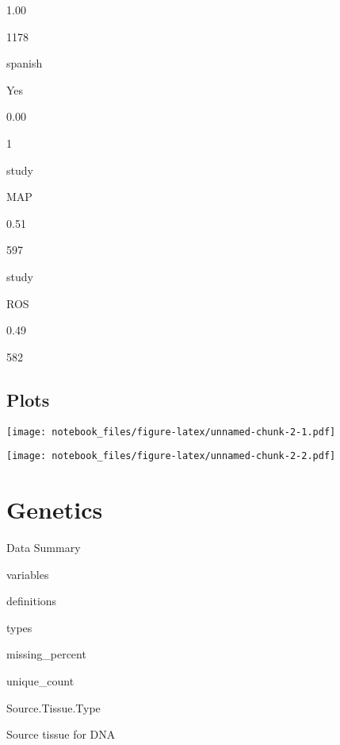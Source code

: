 \documentclass[]{book}
\newenvironment{Shaded}{\begin{snugshade}}{\end{snugshade}}
\newcommand{\DataTypeTok}[1]{\textcolor[rgb]{0.13,0.29,0.53}{#1}}
\newcommand{\DecValTok}[1]{\textcolor[rgb]{0.00,0.00,0.81}{#1}}
\newcommand{\KeywordTok}[1]{\textcolor[rgb]{0.13,0.29,0.53}{\textbf{#1}}}
\newcommand{\NormalTok}[1]{#1}
\newcommand{\OperatorTok}[1]{\textcolor[rgb]{0.81,0.36,0.00}{\textbf{#1}}}
\newcommand{\StringTok}[1]{\textcolor[rgb]{0.31,0.60,0.02}{#1}}
\begin{document}
1.00

1178

spanish

Yes

0.00

1

study

MAP

0.51

597

study

ROS

0.49

582

\hypertarget{plots}{%
\subsection{Plots}\label{plots}}

\begin{Shaded}
\end{Shaded}

\texttt{[image: notebook\_files/figure-latex/unnamed-chunk-2-1.pdf]}

\begin{Shaded}
\end{Shaded}

\texttt{[image: notebook\_files/figure-latex/unnamed-chunk-2-2.pdf]}

\hypertarget{genetics}{%
\section{Genetics}\label{genetics}}

\label{tab:rosmap-genetic-global}Data Summary

variables

definitions

types

missing\_percent

unique\_count

Source.Tissue.Type

Source tissue for DNA
\end{document}
